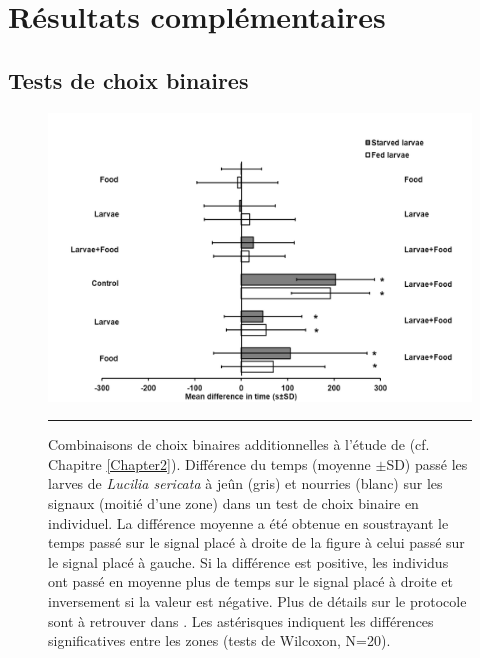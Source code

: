 
\chapter{Résultats complémentaires} %

\label{Annexes1} %


\section{Tests de choix binaires}

\begin{figure}[ht]
\centering
		\includegraphics[width=1 \textwidth]{Figures/testchoixbinaire3.png}
		\rule{35em}{0.5pt}
		\caption[Exp2]{Combinaisons de choix binaires additionnelles à l'étude de \citet{boulay_evidence_2013} (cf. Chapitre \ref{Chapter2}). Différence du temps (moyenne $\pm$SD) passé les larves de \textit{Lucilia sericata} à jeûn (gris) et nourries (blanc) sur les signaux (moitié d'une zone) dans un test de choix binaire en individuel. La différence moyenne a été obtenue en soustrayant le temps passé sur le signal placé à droite de la figure à celui passé sur le signal placé à gauche. Si la différence est positive, les individus ont passé en moyenne plus de temps sur le signal placé à droite et inversement si la valeur est négative. Plus de détails sur le protocole sont à retrouver dans \citet{boulay_evidence_2013}. Les astérisques indiquent les différences significatives entre les zones (tests de Wilcoxon, N=20).}
	\label{fig:exp2}
    
\end{figure}


